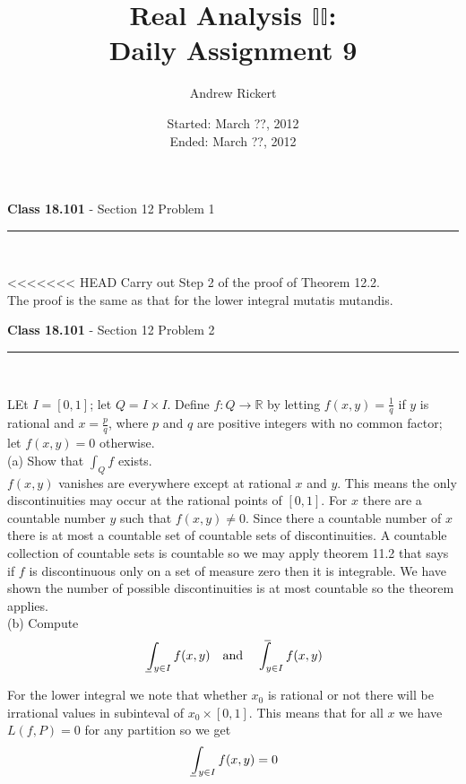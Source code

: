 \documentclass[11pt,reqno]{article}
\title{Real Analysis $\mathbb{II}$: \\ Daily Assignment 9}
\author{Andrew Rickert}
\date{Started: March ??, 2012 \\ \hspace{1pt} Ended: March ??,  2012}                                           %
\def\uint{\mathchoice%
    {\mkern13mu\overline{\vphantom{\intop}\mkern9mu}\mkern-20mu}%
    {\mkern9mu\overline{\vphantom{\intop}\mkern9mu}\mkern-14mu}%
    {\mkern9mu\overline{\vphantom{\intop}\mkern9mu}\mkern-14mu}%
    {\mkern9mu\overline{\vphantom{\intop}\mkern9mu}\mkern-14mu}%
  \int}
\def\lint{\mkern3mu\underline{\vphantom{\intop}\mkern9mu}\mkern-10mu\int}
\begin{document}
\maketitle


\begin{flushleft} 
\textbf{Class 18.101} - Section 12 Problem 1\\
\rule{500pt}{1pt}\\
\end{flushleft} 

<<<<<<< HEAD
\noindent Carry out Step 2 of the proof of Theorem 12.2.\\

The proof is the same as that for the lower integral mutatis mutandis.

\begin{flushleft} 
\textbf{Class 18.101} - Section 12 Problem 2\\
\rule{500pt}{1pt}\\
\end{flushleft} 

LEt $I = [0,1]$; let $Q = I \times I$. Define $f : Q \to \mathbb{R}$ by letting $f(x,y) = \frac{1}{q}$ if $y$ is rational and $x = \frac{p}{q}$, where $p$ and $q$ are positive integers with no common factor; let $f(x,y) = 0$ otherwise.\\

\noindent (a) Show that $\int_Q f$ exists.\\

$f(x,y)$ vanishes are everywhere except at rational $x$ and $y$. This means the only discontinuities may occur at the rational points of $[0,1]$. For $x$ there are a countable number $y$ such that $f(x,y) \neq 0$. Since there a countable number of $x$ there is at most a countable set of countable sets of discontinuities. A countable collection of countable sets is countable so we may apply theorem 11.2 that says if $f$ is discontinuous only on a set of measure zero then it is integrable. We have shown the number of possible discontinuities is at most countable so the theorem applies.\\

\noindent (b) Compute
\[ \lint_{y \in I} f(x,y) \quad \text{and} \quad \uint_{y \in I} f(x,y)\]

For the lower integral we note that whether $x_0$ is rational or not there will be irrational values in subinteval of $x_0 \times [0,1]$. This means that for all $x$ we have $L(f,P) = 0$ for any partition so we get 
\[ \lint_{y \in I} f(x,y)  = 0 \]
\end{document}
